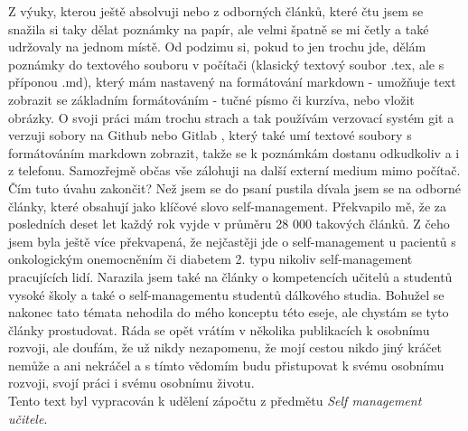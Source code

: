 \documentclass[a4paper]{scrartcl}
\begin{document}
Z výuky, kterou ještě absolvuji nebo z odborných článků, které čtu jsem se snažila si taky dělat poznámky na papír, ale velmi špatně se mi četly a také 
udržovaly na jednom místě. Od podzimu si, pokud to jen trochu jde, dělám poznámky do textového souboru v počítači (klasický textový soubor .tex, ale s příponou 
.md), který mám nastavený na formátování markdown - umožňuje text zobrazit se základním formátováním - tučné písmo či kurzíva, nebo vložit obrázky. O svoji 
práci mám trochu strach a tak používám verzovací systém git a verzuji sobory na Github \cite{github} nebo Gitlab \cite{gitlab}, který také umí textové soubory s 
formátováním markdown zobrazit, takže se k poznámkám dostanu odkudkoliv a i z telefonu. Samozřejmě občas vše zálohuji na další externí medium mimo počítač.\\

\indent Čím tuto úvahu zakončit? Než jsem se do psaní pustila dívala jsem se na odborné články, které obsahují jako klíčové slovo self-management. Překvapilo 
mě, že za posledních deset let každý rok vyjde v průměru 28 000 takových článků. Z čeho jsem byla ještě více překvapená, že nejčastěji jde o self-management u 
pacientů s onkologickým onemocněním či diabetem 2. typu nikoliv self-management pracujících lidí. Narazila jsem také na články o kompetencích učitelů a studentů 
vysoké školy a také o self-managementu studentů dálkového studia. Bohužel se nakonec tato témata nehodila do mého konceptu této eseje, ale chystám se tyto 
články prostudovat. Ráda se opět vrátím v několika publikacích k osobnímu rozvoji, ale doufám, že už nikdy nezapomenu, že mojí cestou nikdo jiný kráčet nemůže a 
ani nekráčel a s tímto vědomím budu přistupovat k svému osobnímu rozvoji, svojí práci i svému osobnímu životu.\\


\vspace{36pt}
\indent Tento text byl vypracován k udělení zápočtu z předmětu {\it Self management učitele}.

\end{document}
